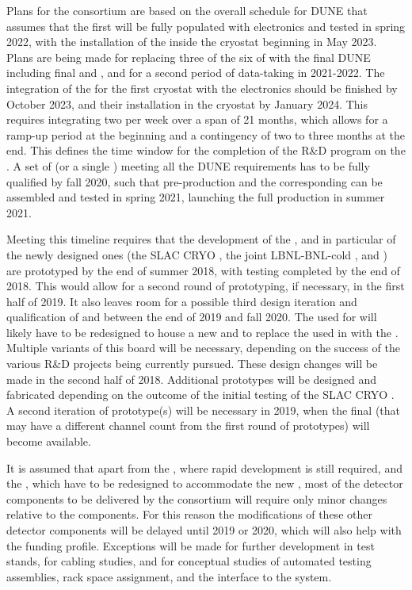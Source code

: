 Plans for the  consortium are based on the overall schedule for DUNE
that assumes that the first  will be fully populated with electronics
and tested in spring 2022, with the installation of
the  inside the cryostat beginning in May 2023. Plans are being made
for replacing three of the six  of  with the final DUNE 
 including final  and , and for a second period of
data-taking in 2021-2022. The integration of the
 for the first cryostat with the electronics should be finished by
October 2023, and their installation in the cryostat by January 2024.
This requires integrating two  per week over a span of 21 months,
which allows for a ramp-up period at the beginning and a contingency of
two to three months at the end. This defines the time window for the completion of
the R\&D program on the . A set of  (or a single ) meeting
all the DUNE requirements has to be fully qualified by fall 2020, such
that pre-production  and the corresponding  can be assembled and
tested in spring 2021, launching the full production in summer 2021.

Meeting this timeline requires that the development of the , and in particular
of the newly designed ones (the SLAC CRYO , the joint LBNL-BNL-\fnal cold ,
and ) are prototyped by the end of summer 2018, with testing
completed by the end of 2018. This would allow for a second round of prototyping,
if necessary, in the first half of 2019. It also leaves room for a possible
third design iteration and qualification of  and  between the
end of 2019 and fall 2020. The  used for  will
likely have to be redesigned to house a new  and to replace the  used
in  with the  . Multiple variants of this board will be
necessary, depending on the success of the various  R\&D projects being currently
pursued. These design changes will be made in the second half of 2018.
Additional  prototypes will be designed and fabricated depending on
the outcome of the initial testing of the SLAC CRYO . A second iteration
of  prototype(s) will be necessary in 2019, when the final  (that
may have a different channel count from the first round of prototypes) will become
available. 

It is assumed that apart from the , where rapid development is still
required, and the , which have to be redesigned to accommodate the
new , most of the detector components to be delivered by the  consortium
will require only minor changes relative to the  components. For
this reason the modifications of these other detector components will
be delayed until 2019 or 2020, which will also help with the funding profile.
Exceptions will be made for further development in test stands, for cabling
studies, and for conceptual studies of automated testing assemblies, rack space
assignment, and the interface to the  system.
